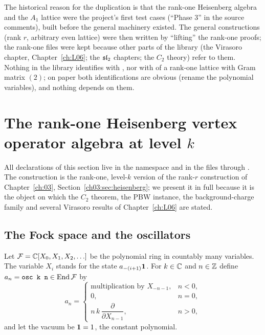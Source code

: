 The historical reason for the duplication is that the rank-one Heisenberg algebra and the $A_1$
lattice were the project's first test cases (``Phase 3'' in the source comments), built before the
general machinery existed. The general constructions (rank $r$, arbitrary even lattice) were then
written by ``lifting'' the rank-one proofs; the rank-one files were kept because other parts of the
library (the Virasoro chapter, Chapter~\ref{ch:L06}; the $\mathfrak{sl}_2$ chapters; the $C_2$ theory) refer
to them. Nothing in the library identifies  with
, nor  with  of a rank-one lattice
with Gram matrix $(2)$; on paper both identifications are obvious (rename the polynomial variables),
and nothing depends on them.

\section{The rank-one Heisenberg vertex operator algebra at level \texorpdfstring{$k$}{k}}\label{l05:sec:heis1}

All declarations of this section live in the namespace  and in the files
 through
. The construction is the
rank-one, level-$k$ version of the rank-$r$ construction of Chapter~\ref{ch:03},
Section~\ref{ch03:sec:heisenberg}; we present it in full because it is the object on which the
$C_2$ theorem, the PBW instance, the background-charge family and several Virasoro results of
Chapter~\ref{ch:L06} are stated.

\subsection{The Fock space and the oscillators}

\begin{definition}\label{l05:def:fock}
Let $\mathcal{F}={\mathbb{C}}[X_0,X_1,X_2,\ldots]$ be the polynomial ring in countably many variables. The variable
$X_i$ stands for the state $a_{-(i+1)}\mathbf{1}$. For $k\in{\mathbb{C}}$ and $n\in{\mathbb{Z}}$ define
$a_n=\lean{osc k n}\in\End\lfiveF$ by
\begin{equation*}
 a_n=\begin{cases}\text{multiplication by }X_{-n-1}, & n<0,\\ 0, & n=0,\\
 n\,k\,\dfrac{\partial}{\partial X_{n-1}}, & n>0,\end{cases}
\end{equation*}
and let the vacuum be $\mathbf{1}=1$, the constant polynomial.
\end{definition}

